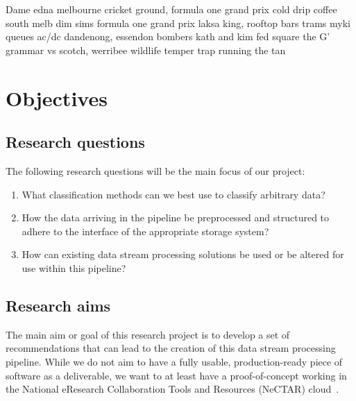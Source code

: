 \documentclass[a4paper,11pt]{article}
\begin{document}
Dame edna melbourne cricket ground, formula one grand prix cold drip coffee south melb dim sims formula one grand prix laksa king, rooftop bars trams myki queues ac/dc dandenong, essendon bombers kath and kim fed square the G' grammar vs scotch, werribee wildlife temper trap running the tan




\section{Objectives} %
\label{sec:objectives}

\subsection{Research questions} %
\label{sub:research_questions}

The following research questions will be the main focus of our project:

\begin{enumerate}
  \item What classification methods can we best use to classify arbitrary data?
  \item How the data arriving in the pipeline be preprocessed and structured to adhere to the interface of the appropriate
   storage system?
  \item How can existing data stream processing solutions be used or be altered for use within this pipeline?
\end{enumerate}



\subsection{Research aims} %
\label{sub:research_aims}

The main aim or goal of this research project is to develop a set of recommendations that can lead to the creation of
this data stream processing pipeline. While we do not aim to have a fully usable, production-ready piece of software as a
deliverable, we want to at least have a proof-of-concept working in the National eResearch Collaboration Tools and Resources
(NeCTAR) cloud~\cite{web:Nectar}.


\end{document}
